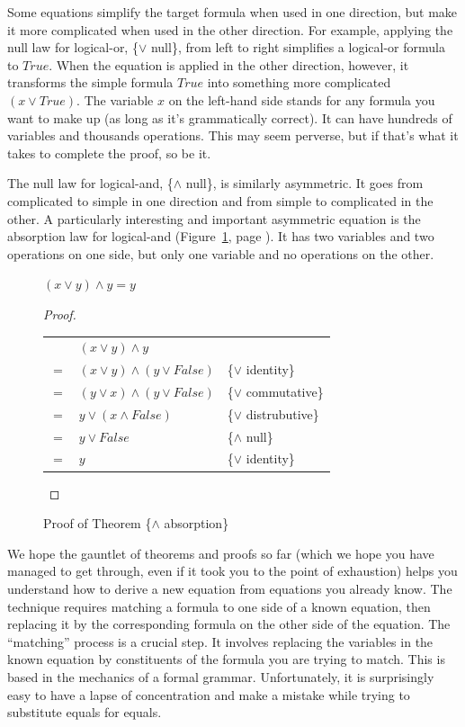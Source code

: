 Some equations simplify the target formula when used in one direction,
but make it more complicated when used in the other direction.
For example, applying
the null law for logical-or, \{$\vee$ null\}, from left to right simplifies a logical-or formula to $True$.
When the equation is applied in the other direction, however,
it transforms the simple formula $True$ into something more complicated $(x \vee True)$.
The variable $x$ on the left-hand side
stands for any formula you want to make up (as long as it's grammatically correct).
It can have hundreds of variables and thousands operations.
This may seem perverse, but if that's what it takes to complete the proof, so be it.

The null law for logical-and, \{$\wedge$ null\}, is similarly asymmetric.
It goes from complicated to simple in one direction
and from simple to complicated in the other.
A particularly interesting and important asymmetric equation
is the absorption law for logical-and
(Figure~\ref{and-absorption-thm}, page \pageref{and-absorption-thm}).
It has two variables and two operations on one side, but only one variable and no operations on the other.

\begin{figure}
\begin{theorem}
$(x \vee y) \wedge y = y$
\end{theorem}

\begin{proof}
\mbox{} \\
\begin{tabular}{llp{3.15in}}
    & $(x \vee y) \wedge y$                & \\
$=$ & $(x \vee y) \wedge (y \vee False)$   & \{$\vee$ identity\} \\
$=$ & $(y \vee x) \wedge (y \vee False)$   & \{$\vee$ commutative\} \\
$=$ & $y \vee (x \wedge False)$            & \{$\vee$ distrubutive\} \\
$=$ & $y \vee False$                       & \{$\wedge$ null\} \\
$=$ & $y$                                  & \{$\vee$ identity\} \\
\end{tabular}

\end{proof}
\caption{Proof of Theorem \{$\wedge$ absorption\}}
\label{and-absorption-thm}
\end{figure}

We hope the gauntlet of theorems and proofs so far
(which we hope you have managed to get through, 
even if it took you to the point of exhaustion)
helps you understand how to derive a new equation from equations you already know.
The technique requires matching a formula to one side of a known equation,
then replacing it by the corresponding formula on the other side
of the equation.
The ``matching'' process is a crucial step.
It involves replacing the variables in the known equation
by constituents of the formula you are trying to match.
This is based in the mechanics of a formal grammar.
Unfortunately, it is surprisingly easy 
to have a lapse of concentration and make a mistake
while trying to substitute equals for equals.

